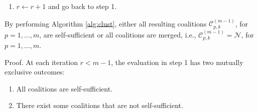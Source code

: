 \begin{alg}
\begin{enumerate}
		\item $r\leftarrow r+1$ and go back to step 1. %
	\end{enumerate}
\end{alg}
\begin{prop}
	\label{prop:alg_clus}
	By performing Algorithm \ref{alg:clust}, either all resulting coalitions $\mathcal{C}_{p,k}^{(m-1)}$, for $p=1,\dots,m$, are self-sufficient or all coalitions are merged, i.e., $\mathcal{C}_{p,k}^{(m-1)}=\mathcal{N}$, for $p=1,\dots,m$. \eod
\end{prop}


\begin{pf*}{Proof.}
	 At each iteration $r<m-1$, the evaluation in step 1 has two mutually exclusive outcomes:
	 \begin{enumerate}
	 		 	\setlength\itemsep{0.0em}
	 	\item All coalitions are self-sufficient.
	 	\item There exist some coalitions that are not self-sufficient.

\end{enumerate}
\end{pf*}
